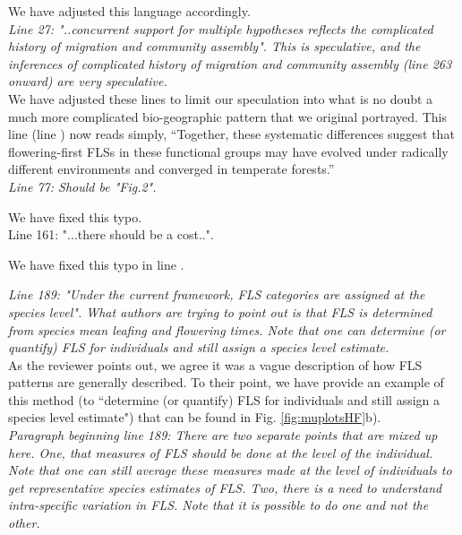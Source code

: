 \documentclass{article}[11pt]
\begin{document}
\noident We have adjusted this language accordingly.\\

\emph{Line 27: "..concurrent support for multiple hypotheses reflects the complicated history of migration and community assembly". This is speculative, and the inferences of complicated history of migration and community assembly (line 263 onward) are very speculative.}\\

\noindent We have adjusted these lines to limit our speculation into what is no doubt a much more complicated bio-geographic pattern that we original portrayed. This line (line ) now reads simply, ``Together, these systematic differences suggest that flowering-first FLSs in these functional groups may have evolved under radically different environments and converged in temperate forests.'' \\

\emph{Line 77: Should be "Fig.2".}

\noindent We have fixed this typo.\\

Line 161: "...there should be a cost..".

\noindent We have fixed this typo in line .

\emph{Line 189: "Under the current framework, FLS categories are assigned at the species level". What authors are trying to point out is that FLS is determined from species mean leafing and flowering times. Note that one can determine (or quantify) FLS for individuals and still assign a species level estimate.}\\

\noindent As the reviewer points out, we agree it was a vague description of how FLS patterns are generally described. To their point, we have provide an example of this method (to ``determine (or quantify) FLS for individuals and still assign a species level estimate") that can be found in Fig. \ref{fig:muplotsHF}b).\\


\emph{Paragraph beginning line 189: There are two separate points that are mixed up here. One, that measures of FLS should be done at the level of the individual. Note that one can still average these measures made at the level of individuals to get representative species estimates of FLS. Two, there is a need to understand intra-specific variation in FLS. Note that it is possible to do one and not the other.}
 
\end{document}
